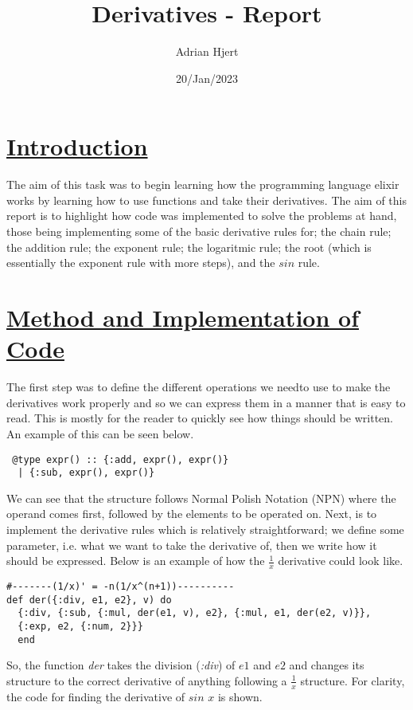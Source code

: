 \documentclass[a4paper,11pt]{article}
\begin{document}
\title{
	\textbf{Derivatives - Report}
}
\author{Adrian Hjert}
\date{20/Jan/2023}

\maketitle

\section*{
	\underline{Introduction}
	}
The aim of this task was to begin learning how the programming language elixir works by learning how to use functions and take their derivatives. The aim of this report is to highlight how code was implemented to solve the problems at hand, those being implementing some of the basic derivative rules for; the chain rule; the addition rule; the exponent rule; the logaritmic rule; the root (which is essentially the exponent rule with more steps), and the $sin$ rule.

\section*{
	\underline{Method and Implementation of Code}
	}
The first step was to define the different operations we needto use to make the derivatives work properly and so we can express them in a manner that is easy to read. This is mostly for the reader to quickly see how things should be written. An example of this can be seen below.
\begin{verbatim}
 @type expr() :: {:add, expr(), expr()}
  | {:sub, expr(), expr()}
\end{verbatim}
We can see that the structure follows Normal Polish Notation (NPN) where the operand comes first, followed by the elements to be operated on.
Next, is to implement the derivative rules which is relatively straightforward; we define some parameter, i.e. what we want to take the derivative of, then we write how it should be expressed. Below is an example of how the $\frac{1}{x}$ derivative could look like.

\begin{verbatim}
#-------(1/x)' = -n(1/x^(n+1))----------
def der({:div, e1, e2}, v) do
  {:div, {:sub, {:mul, der(e1, v), e2}, {:mul, e1, der(e2, v)}}, 
  {:exp, e2, {:num, 2}}} 
  end
\end{verbatim}

So, the function \textit{der} takes the division (\textit{:div}) of $e1$ and $e2$ and changes its structure to the correct derivative of anything following a $\frac{1}{x}$ structure.
For clarity, the code for finding the derivative of $sin$ $x$ is shown.
\end{document}
